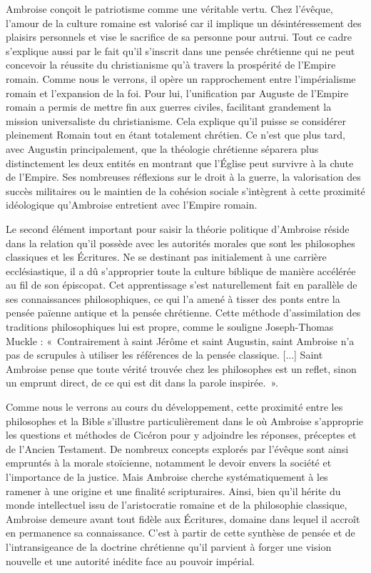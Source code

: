 Ambroise conçoit le patriotisme comme une véritable vertu. Chez l'évêque, l'amour de la culture romaine est valorisé car il implique un désintéressement des plaisirs personnels et vise le sacrifice de sa personne pour autrui. Tout ce cadre s'explique aussi par le fait qu'il s'inscrit dans une pensée chrétienne qui ne peut concevoir la réussite du christianisme qu'à travers la prospérité de l'Empire romain. Comme nous le verrons, il opère un rapprochement entre l'impérialisme romain et l'expansion de la foi. Pour lui, l’unification par Auguste de l'Empire romain a permis de mettre fin aux guerres civiles, facilitant grandement la mission universaliste du christianisme. Cela explique qu'il puisse se considérer pleinement Romain tout en étant totalement chrétien. Ce n'est que plus tard, avec Augustin principalement, que la théologie chrétienne séparera plus distinctement les deux entités en montrant que l'Église peut survivre à la chute de l'Empire. Ses nombreuses réflexions sur le droit à la guerre, la valorisation des succès militaires ou le maintien de la cohésion sociale s'intègrent à cette proximité idéologique qu'Ambroise entretient avec l'Empire romain.

\bigskip

Le second élément important pour saisir la théorie politique d'Ambroise réside dans la relation qu’il possède avec les autorités morales que sont les philosophes classiques et les Écritures. Ne se destinant pas initialement à une carrière ecclésiastique, il a dû s'approprier toute la culture biblique de manière accélérée au fil de son épiscopat. Cet apprentissage s'est naturellement fait en parallèle de ses connaissances philosophiques, ce qui l’a amené à tisser des ponts entre la pensée païenne antique et la pensée chrétienne. Cette méthode d'assimilation des traditions philosophiques lui est propre, comme le souligne Joseph-Thomas Muckle : «~Contrairement à saint Jérôme et saint Augustin, saint Ambroise n’a pas de scrupules à utiliser les références de la pensée classique. [...] Saint Ambroise pense que toute vérité trouvée chez les philosophes est un reflet, sinon un emprunt direct, de ce qui est dit dans la parole inspirée.~»\autocite{muckle_officiis}.

\bigskip

Comme nous le verrons au cours du développement, cette proximité entre les philosophes et la Bible s'illustre particulièrement dans le  où Ambroise s'approprie les questions et méthodes de Cicéron pour y adjoindre les réponses, préceptes et  de l'Ancien Testament. De nombreux concepts explorés par l'évêque sont ainsi empruntés à la morale stoïcienne, notamment le devoir envers la société et l'importance de la justice. Mais Ambroise cherche systématiquement à les ramener à une origine et une finalité scripturaires. Ainsi, bien qu'il hérite du monde intellectuel issu de l'aristocratie romaine et de la philosophie classique, Ambroise demeure avant tout fidèle aux Écritures, domaine dans lequel il accroît en permanence sa connaissance. C'est à partir de cette synthèse de pensée et de l'intransigeance de la doctrine chrétienne qu'il parvient à forger une vision nouvelle et une autorité inédite face au pouvoir impérial.

